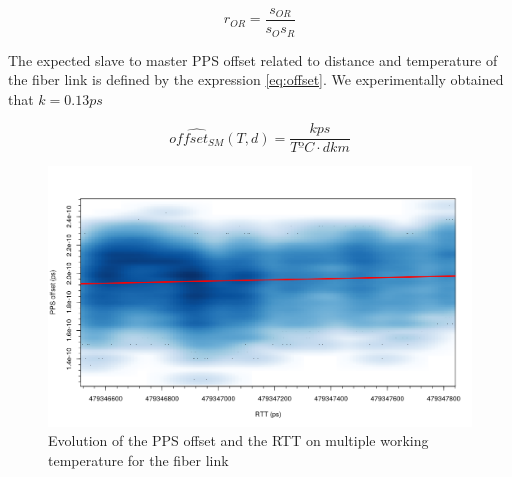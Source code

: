 \begin{equation}\label{eq:r}
r_{OR} = \frac{s_{OR}}{s_{O} s_{R}}
\end{equation}

The expected slave to master PPS offset related to distance and temperature of 
the fiber link is defined by the expression \ref{eq:offset}. We experimentally 
obtained that $k=0.13 ps$ 

\begin{equation}\label{eq:offset}
	\hat{offset_{SM}} (T,d) = \frac {k ps} {T ºC \cdot d km}
\end{equation}

\begin{figure}
	\centering
	\includegraphics[width=1\linewidth]{img/ppsvsrtt}
	\caption[Evolution of the PPS offset and the RTT on multiple working 
	temperature for the fiber link]{Evolution of the PPS offset and the RTT on 
	multiple working temperature for the fiber link}
	\label{fig:ppsvsrtt}
\end{figure}

